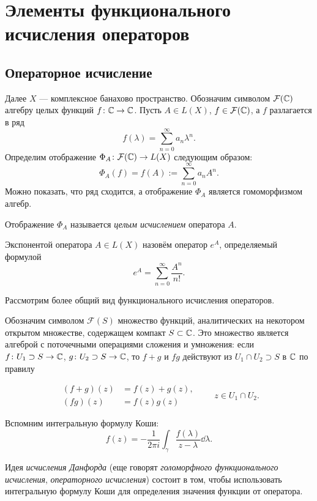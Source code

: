 \section{Элементы функционального исчисления операторов}
\subsection{Операторное исчисление}
Далее $X$ --- комплексное банахово пространство. Обозначим символом
$\mathcal F(\mathbb{C})$ алгебру целых функций $f \colon \mathbb{C} \to \mathbb{C}$.
Пусть $A \in L(X)$, $f \in \mathcal F(\mathbb{C})$, а $f$ разлагается в ряд
\[ f(\lambda) = \sum_{n=0}^\infty a_n \lambda^n. \]
Определим отображение $\Phi_A \colon \mathcal F(\mathbb{C}) \to L(X)$ следующим образом:
\[ \Phi_A(f) = f(A) := \sum_{n=0}^\infty a_n A^n. \]
Можно показать, что ряд сходится, а отображение $\Phi_A$ является гомоморфизмом алгебр.

Отображение $\Phi_A$ называется \emph{целым исчислением} оператора $A$.

\begin{example}
    Экспонентой оператора $A \in L(X)$ назовём оператор $e^A$, определяемый формулой
    \[ e^A = \sum_{n=0}^\infty \frac{A^n}{n!}. \]
\end{example}

Рассмотрим более общий вид функционального исчисления операторов.

Обозначим символом $\mathcal F(S)$ множество функций, аналитических на некотором открытом
множестве, содержащем компакт $S \subset \mathbb{C}$. Это множество является алгеброй с
поточечными операциями сложения и умножения: если $f \colon U_1 \supset S \to \mathbb{C}$,
$g \colon U_2 \supset S \to \mathbb{C}$, то $f + g$ и $fg$ действуют из $U_1 \cap U_2 \supset S$ в
$\mathbb{C}$ по правилу

\[ \begin{aligned}
    (f + g)(z) &= f(z) + g(z), \\
    (fg)(z) &= f(z)g(z)
\end{aligned} \quad\quad z \in U_1 \cap U_2. \]

Вспомним интегральную формулу Коши:
\[ f(z) = -\frac{1}{2\pi i} \int_{\gamma} \frac{f(\lambda)}{z - \lambda} \dd \lambda. \]

Идея \emph{исчисления Данфорда} (еще говорят \emph{голоморфного функционального исчисления},
\emph{операторного исчисления}) состоит в том, чтобы использовать интегральную формулу Коши для 
определения значения функции от оператора.

